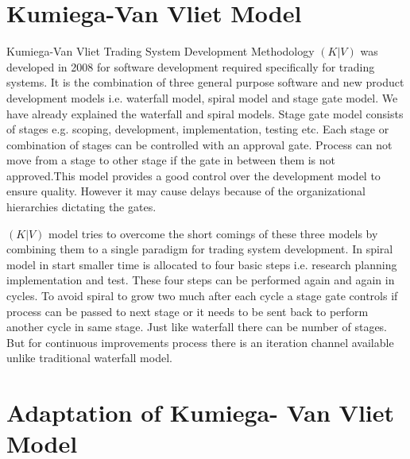 \section{Kumiega-Van Vliet Model}   
      
Kumiega-Van Vliet Trading System Development Methodology \((K|V)\) was developed in 2008 for software development required specifically for trading systems. It is the combination of three general purpose software and new product development models i.e. waterfall model, spiral model and stage gate model. We have already explained the waterfall and spiral models. Stage gate model consists of stages e.g. scoping, development, implementation, testing etc. Each stage or combination of stages can be controlled with an approval gate. Process can not move from a stage to other stage if the gate in between them is not approved.This model provides a good control over the development model to ensure quality. However it may cause delays because of the organizational hierarchies dictating the gates.

 \((K|V)\) model tries to overcome the short comings of these three models by combining them to a single paradigm for trading system development\cite{kumiega2008software}. In spiral model in start smaller time is allocated to four basic steps i.e. research planning implementation and test. These four steps can be performed again and again in cycles. To avoid spiral to grow two much after each cycle a stage gate controls if process can be passed to next stage or it needs to be sent back to perform another cycle in same stage. Just like waterfall there can be number of stages. But for continuous improvements process there is an iteration channel available unlike traditional waterfall model.
 \section{Adaptation of Kumiega- Van Vliet Model}
